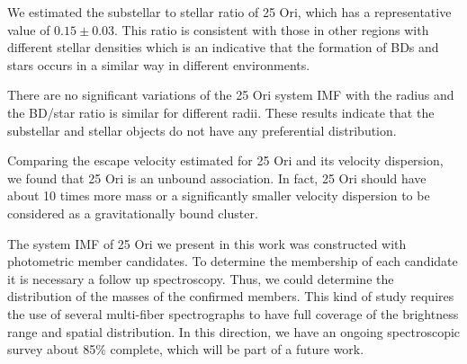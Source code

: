 \documentclass[12pt]{article}
\begin{document}
We estimated the substellar to stellar ratio of 25 Ori, which has a representative value of $0.15\pm0.03$. This ratio is consistent with those in other regions with different stellar densities which is an indicative that the formation of BDs and stars occurs in a similar way in different environments.

There are no significant variations of the 25 Ori system IMF with the radius and the BD/star ratio is similar for different radii. These results indicate that the substellar and stellar objects do not have any preferential distribution.

Comparing the escape velocity estimated for 25 Ori and its velocity dispersion, we found that 25 Ori is an unbound association. In fact, 25 Ori should have about 10 times more mass or a significantly smaller velocity dispersion to be considered as a gravitationally bound cluster.

The system IMF of 25 Ori we present in this work was constructed with photometric member candidates. To determine the membership of each candidate it is necessary a follow up spectroscopy. Thus, we could determine the distribution of the masses of the confirmed members. This kind of study requires the use of several multi-fiber spectrographs to have full coverage of the brightness range and spatial distribution. In this direction, we have an ongoing spectroscopic survey about 85\% complete, which will be part of a future work. 
\end{document}
